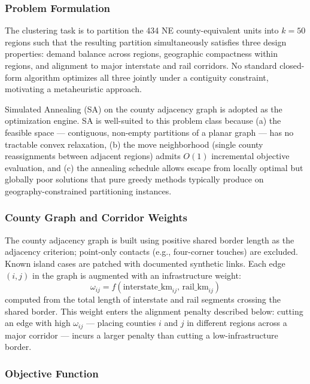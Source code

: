 \subsubsection{Problem Formulation}

The clustering task is to partition the 434 NE county-equivalent units into $k = 50$
regions such that the resulting partition simultaneously satisfies three design properties:
demand balance across regions, geographic compactness within regions, and alignment to
major interstate and rail corridors. No standard closed-form algorithm optimizes all three
jointly under a contiguity constraint, motivating a metaheuristic approach.

Simulated Annealing (SA) on the county adjacency graph is adopted as the optimization
engine. SA is well-suited to this problem class because (a) the feasible space --- contiguous,
non-empty partitions of a planar graph --- has no tractable convex relaxation, (b) the
move neighborhood (single county reassignments between adjacent regions) admits $O(1)$
incremental objective evaluation, and (c) the annealing schedule allows escape from locally
optimal but globally poor solutions that pure greedy methods typically produce on
geography-constrained partitioning instances.

\subsubsection{County Graph and Corridor Weights}

The county adjacency graph is built using positive shared border length as the adjacency
criterion; point-only contacts (e.g., four-corner touches) are excluded. Known island
cases are patched with documented synthetic links. Each edge $(i,j)$ in the graph is
augmented with an infrastructure weight:
\begin{equation}
  \omega_{ij} = f\!\left(\text{interstate\_km}_{ij},\, \text{rail\_km}_{ij}\right)
\end{equation}
computed from the total length of interstate and rail segments crossing the shared border.
This weight enters the alignment penalty described below: cutting an edge with high
$\omega_{ij}$ --- placing counties $i$ and $j$ in different regions across a major
corridor --- incurs a larger penalty than cutting a low-infrastructure border.

\subsubsection{Objective Function}

